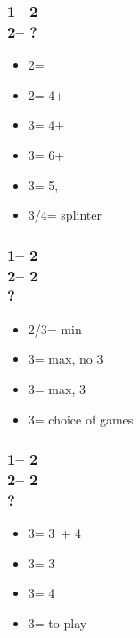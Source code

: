 \documentclass[12pt, a4paper]{report}
\begin{document}
{{        \subsubsection*{1\nt -- 2\diams\\
                        2\hearts -- ?}
        \begin{itemize}
            \item 2\spades = \inv
            \item 2\nt = 4+\clubs\ \gf
            \item 3\clubs = 4+\diams\ \gf
            \item 3\diams = 6+\hearts\ \gf
            \item 3\hearts = 5\spades, \inv
            \item 3\spades/4\minor = splinter
        \end{itemize}

        \subsubsection*{1\nt -- 2\diams\\
                        2\hearts -- 2\spades\\
                        ?}
        \begin{itemize}
            \item 2\nt/3\hearts = min
            \item 3\clubs = max, no 3\hearts
            \item 3\diams = max, 3\hearts
            \item 3\nt = choice of games
        \end{itemize}

        \subsubsection*{1\nt -- 2\diams\\
                        2\hearts -- 2\nt\\
                        ?}
        \begin{itemize}
            \item 3\clubs = 3\hearts\ + 4\clubs
            \item 3\diams = 3\hearts
            \item 3\hearts = 4\clubs
            \item 3\nt = to play
        \end{itemize}

}}
\end{document}
